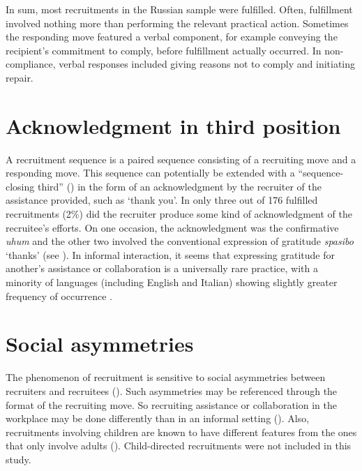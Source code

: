 \documentclass[output=paper,modfonts,nonflat]{langsci/langscibook}
\begin{document}
In sum, most recruitments in the Russian sample were fulfilled. Often, fulfillment involved nothing more than performing the relevant practical action. Sometimes the responding move featured a verbal component, for example conveying the recipient’s commitment to comply, before fulfillment actually occurred. In non-compliance, verbal responses included giving reasons not to comply and initiating repair.

\section{Acknowledgment in third position}

A recruitment sequence is a paired sequence consisting of a recruiting move and a responding move. This sequence can potentially be extended with a “sequence-closing third” (\citealt{Schegloff2007}) in the form of an acknowledgment by the recruiter of the assistance provided, such as ‘thank you’. In only three out of 176 fulfilled recruitments (2\%) did the recruiter produce some kind of acknowledgment of the recruitee’s efforts. On one occasion, the acknowledgment was the confirmative \textit{uhum} and the other two involved the conventional expression of gratitude \textit{spasibo} `thanks' (see ). In informal interaction, it seems that expressing gratitude for another's assistance or collaboration is a universally rare practice, with a minority of languages (including English and Italian) showing slightly greater frequency of occurrence \citep{FloydEtAl2018}.

\section{Social asymmetries}\label{sec:baranova:6}

The phenomenon of recruitment is sensitive to social asymmetries between recruiters and recruitees (\citealt{BrownLevinson1987}). Such asymmetries may be referenced through the format of the recruiting move. So recruiting assistance or collaboration in the workplace may be done differently than in an informal setting (\citealt{Garvey1975,Corsaro1977,Dixon2015,TakadaEndo2015}). Also, recruitments involving children are known to have different features from the ones that only involve adults (\citealt{DrewHeritage1992}). Child-directed recruitments were not included in this study.
\end{document}
